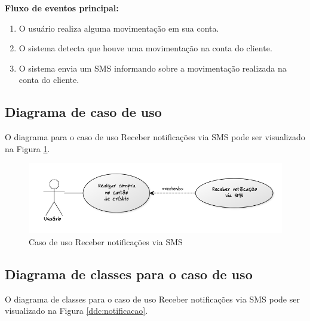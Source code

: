 \textbf{Fluxo de eventos principal:}

\begin{enumerate}
  \item O usuário realiza alguma movimentação em sua conta.
  \item O sistema detecta que houve uma movimentação na conta do cliente.
  \item O sistema envia um SMS informando sobre a movimentação realizada na conta do cliente.
\end{enumerate}

\subsection{Diagrama de caso de uso}

O diagrama para o caso de uso Receber notificações via SMS pode ser visualizado na Figura \ref{cdu:notificacao}.

\begin{figure}[!htb]
     \centering
     \includegraphics[scale=0.6]{diagramas/caso-de-uso/imagens/receberNotificacaoSms.png}
     \caption{Caso de uso Receber notificações via SMS}
     \label{cdu:notificacao}
\end{figure}

\subsection{Diagrama de classes para o caso de uso}

O diagrama de classes para o caso de uso Receber notificações via SMS pode ser visualizado na Figura \ref{ddc:notificacao}.

